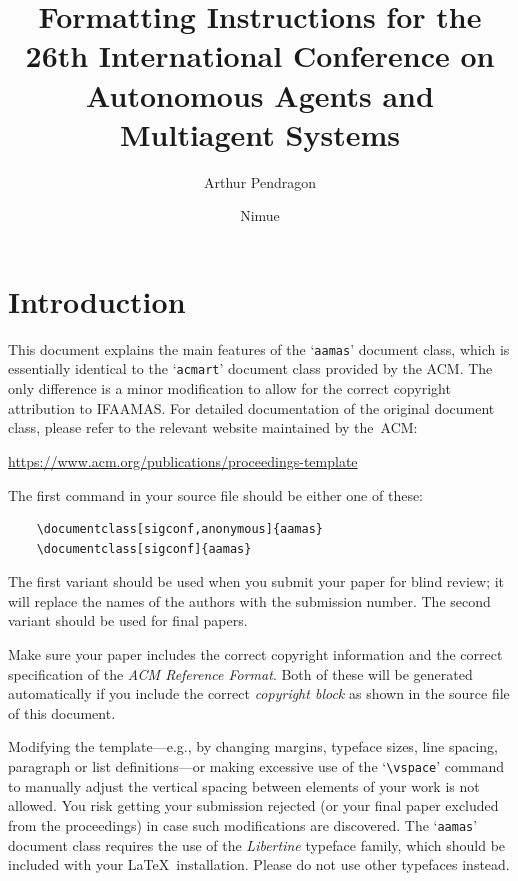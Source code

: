 \documentclass[sigconf,anonymous]{aamas}
\title[AAMAS-2027 Formatting Instructions]{Formatting Instructions for the 26th International Conference on Autonomous Agents and Multiagent Systems}
\author{Arthur Pendragon}
\affiliation{
  \institution{Camelot Castle}
  \city{Camelot}
  \country{United Kingdom}}
\author{Nimue}
\affiliation{
  \institution{The Lady's Lake}
  \city{Avalon}
  \country{United Kingdom}}
\begin{document}



\maketitle 


\section{Introduction}

This document explains the main features of the `\texttt{aamas}' 
document class, which is essentially identical to the `\texttt{acmart}'
document class provided by the ACM. The only difference is a minor 
modification to allow for the correct copyright attribution to IFAAMAS.
For detailed documentation of the original document class, please refer
to the relevant website maintained by the~ACM:
%
\begin{center}
\url{https://www.acm.org/publications/proceedings-template}
\end{center}
%
The first command in your source file should be either one of these:
\begin{verbatim}
    \documentclass[sigconf,anonymous]{aamas}
    \documentclass[sigconf]{aamas}
\end{verbatim}
%
The first variant should be
used when you submit your paper for blind review; it will replace the names of the authors with the submission number.
The second variant should be used for final papers. 

Make sure your paper includes the correct copyright information and 
the correct specification of the \emph{ACM Reference Format}. Both of 
these will be generated automatically if you include the correct 
\emph{copyright block} as shown in the source file of this document.

Modifying the template---e.g., by changing margins, typeface sizes, 
line spacing, paragraph or list definitions---or making excessive use 
of the `\verb|\vspace|' command to manually adjust the vertical spacing 
between elements of your work is not allowed. You risk getting your 
submission rejected (or your final paper excluded from the proceedings) 
in case such modifications are discovered. The `\texttt{aamas}' document 
class requires the use of the \textit{Libertine} typeface family, which 
should be included with your \LaTeX\ installation. Please do not use 
other typefaces instead.
\end{document}
